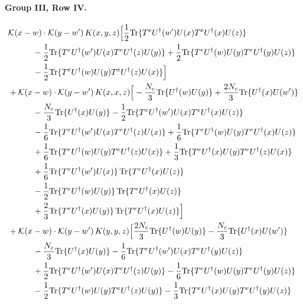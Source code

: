 \documentclass[10pt]{article}
\numberwithin{equation}{section}
\begin{document}
\paragraph{Group III, Row IV.}

\begin{align}
&\mathcal K(x-w)\cdot\mathcal K(y-w')\,K(x,y,z)\Big[\frac{1}{2}{\rm Tr}\{T^eU^\dagger(w')U(x)T^eU^\dagger(x)U(z)\}\notag\\
&\quad\quad\quad-\frac{1}{2}{\rm Tr}\{T^eU^\dagger(w')U(x)T^eU^\dagger(z)U(y)\}+\frac{1}{2}{\rm Tr}\{T^eU^\dagger(w)U(y)T^eU^\dagger(y)U(z)\}\notag\\
&\quad\quad\quad-\frac{1}{2}{\rm Tr}\{T^eU^\dagger(w)U(y)T^eU^\dagger(z)U(x)\}\Big]\notag\\
&+\mathcal K(x-w)\cdot\mathcal K(y-w')\,K(x,x,z)\Big[-\frac{N_c}{3}{\rm Tr}\{U^\dagger(w)U(y)\}+\frac{2 N_c}{3}{\rm Tr}\{U^\dagger(x)U(w')\}\notag\\
&\quad\quad\quad-\frac{N_c}{3}{\rm Tr}\{U^\dagger(x)U(y)\}-\frac{1}{2}{\rm Tr}\{T^eU^\dagger(w')U(x)T^eU^\dagger(x)U(z)\}\notag\\
&\quad\quad\quad-\frac{1}{6}{\rm Tr}\{T^eU^\dagger(w')U(x)T^eU^\dagger(z)U(x)\}+\frac{1}{6}{\rm Tr}\{T^eU^\dagger(w)U(y)T^eU^\dagger(x)U(z)\}\notag\\
&\quad\quad\quad+\frac{1}{6}{\rm Tr}\{T^eU^\dagger(w)U(y)T^eU^\dagger(z)U(x)\}+\frac{1}{3}{\rm Tr}\{T^eU^\dagger(x)U(y)T^eU^\dagger(z)U(x)\}\notag\\
&\quad\quad\quad+\frac{1}{6}{\rm Tr}\{T^eU^\dagger(w')U(x)\}\,{\rm Tr}\{T^eU^\dagger(x)U(z)\}\notag\\
&\quad\quad\quad-\frac{1}{2}{\rm Tr}\{T^eU^\dagger(w)U(y)\}\,{\rm Tr}\{T^eU^\dagger(x)U(z)\}\notag\\
&\quad\quad\quad+\frac{2}{3}{\rm Tr}\{T^eU^\dagger(x)U(y)\}\,{\rm Tr}\{T^eU^\dagger(x)U(z)\}\Big]\notag\\
&+\mathcal K(x-w)\cdot\mathcal K(y-w')\,K(y,y,z)\Big[\frac{2 N_c}{3}{\rm Tr}\{U^\dagger(w)U(y)\}-\frac{N_c}{3}{\rm Tr}\{U^\dagger(x)U(w')\}\notag\\
&\quad\quad\quad-\frac{N_c}{3}{\rm Tr}\{U^\dagger(x)U(y)\}-\frac{1}{6}{\rm Tr}\{T^eU^\dagger(w')U(x)T^eU^\dagger(y)U(z)\}\notag\\
&\quad\quad\quad+\frac{1}{2}{\rm Tr}\{T^eU^\dagger(w')U(x)T^eU^\dagger(z)U(y)\}-\frac{1}{6}{\rm Tr}\{T^eU^\dagger(w)U(y)T^eU^\dagger(y)U(z)\}\notag\\
&\quad\quad\quad-\frac{1}{2}{\rm Tr}\{T^eU^\dagger(w)U(y)T^eU^\dagger(z)U(y)\}-\frac{1}{3}{\rm Tr}\{T^eU^\dagger(x)U(y)T^eU^\dagger(y)U(z)\}\notag\\

\end{align}
\end{document}
